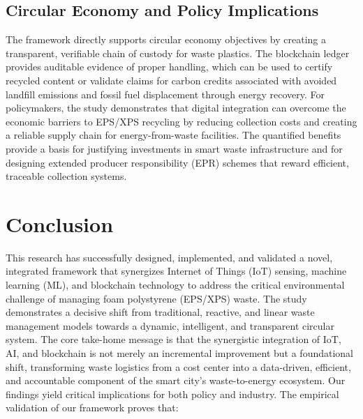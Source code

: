 \documentclass[final,5p,times,twocolumn]{elsarticle}
\begin{document}
\subsection{Circular Economy and Policy Implications}
The framework directly supports circular economy objectives by creating a transparent, verifiable chain of custody for waste plastics. The blockchain ledger provides auditable evidence of proper handling, which can be used to certify recycled content or validate claims for carbon credits associated with avoided landfill emissions and fossil fuel displacement through energy recovery. For policymakers, the study demonstrates that digital integration can overcome the economic barriers to EPS/XPS recycling by reducing collection costs and creating a reliable supply chain for energy-from-waste facilities. The quantified benefits provide a basis for justifying investments in smart waste infrastructure and for designing extended producer responsibility (EPR) schemes that reward efficient, traceable collection systems.

\section{Conclusion}
This research has successfully designed, implemented, and validated a novel, integrated framework that synergizes Internet of Things (IoT) sensing, machine learning (ML), and blockchain technology to address the critical environmental challenge of managing foam polystyrene (EPS/XPS) waste. The study demonstrates a decisive shift from traditional, reactive, and linear waste management models towards a dynamic, intelligent, and transparent circular system. The core take-home message is that the synergistic integration of IoT, AI, and blockchain is not merely an incremental improvement but a foundational shift, transforming waste logistics from a cost center into a data-driven, efficient, and accountable component of the smart city's waste-to-energy ecosystem. Our findings yield critical implications for both policy and industry. The empirical validation of our framework proves that:
\end{document}
